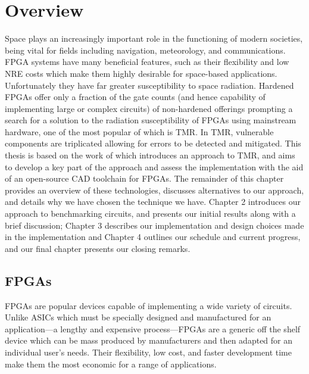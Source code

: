 \documentclass[12pt,final,oneside]{dwThesis} %
\begin{document}
   \section{Overview}
   Space plays an increasingly important role in the functioning of modern societies, being vital for fields including navigation, meteorology, and communications\cite{OECDSpace}. \gls{FPGA} systems have many beneficial features, such as their flexibility and low \gls{NRE} costs which make them highly desirable for space-based applications. Unfortunately they have far greater susceptibility to space radiation. Hardened \glspl{FPGA} offer only a fraction of the gate counts (and hence capability of implementing large or complex circuits) of non-hardened offerings prompting a search for a solution to the radiation susceptibility of \glspl{FPGA} using mainstream hardware\cite{VFPGATMR}, one of the most popular of which is \gls{TMR}. In \gls{TMR}, vulnerable components are triplicated allowing for errors to be detected and mitigated. This thesis is based on the work of\cite{DiesselChange} which introduces an approach to \gls{TMR}, and aims to develop a key part of the approach and assess the implementation with the aid of an open-source \gls{CAD} toolchain for \glspl{FPGA}.
   The remainder of this chapter provides an overview of these technologies, discusses alternatives to our approach, and details why we have chosen the technique we have. Chapter 2 introduces our approach to benchmarking circuits, and presents our initial results along with a brief discussion; Chapter 3 describes our implementation and design choices made in the implementation and Chapter 4 outlines our schedule and current progress, and our final chapter presents our closing remarks.
   \glsresetall
   \subsection{\glspl{FPGA}}
   \glspl{FPGA} are popular devices capable of implementing a wide variety of circuits. Unlike \glspl{ASIC} which must be specially designed and manufactured for an application---a lengthy and expensive process---\glspl{FPGA} are a generic off the shelf device which can be mass produced by manufacturers and then adapted for an individual user's needs. Their flexibility, low cost, and faster development time make them the most economic for a range of applications.
\end{document}
